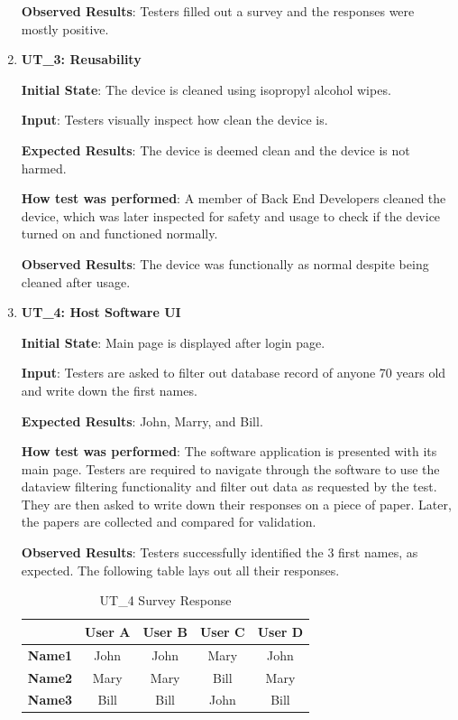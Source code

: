 \documentclass[12pt, titlepage]{article}
\begin{document}
\begin{enumerate}
  \textbf{Observed Results}: Testers filled out a survey and the responses were mostly positive.

  \item\textbf{{UT\_3: Reusability\\}}\label{UT3}

  \textbf{Initial State}: The device is cleaned using isopropyl alcohol wipes.

  \textbf{Input}: Testers visually inspect how clean the device is.

  \textbf{Expected Results}: The device is deemed clean and the device is not harmed.

  \textbf{How test was performed}: A member of Back End Developers cleaned the device, which was later inspected for safety and usage to check if the device turned on and functioned normally.

  \textbf{Observed Results}: The device was functionally as normal despite being cleaned after usage.

  \item\textbf{{UT\_4: Host Software UI \\}}\label{UT4}

  \textbf{Initial State}: Main page is displayed after login page.

  \textbf{Input}: Testers are asked to filter out database record of anyone 70 years old and write down the first names.

  \textbf{Expected Results}: John, Marry, and Bill.

  \textbf{How test was performed}: The software application is presented with its main page. Testers are required to navigate through the software to use the dataview filtering functionality and filter out data as requested by the test. They are then asked to write down their responses on a piece of paper. Later, the papers are collected and compared for validation.

  \textbf{Observed Results}: Testers successfully identified the 3 first names, as expected. The following table lays out all their responses.

\begin{table}[H]
\centering
\caption{UT\_4 Survey Response}
  \begin{tabular}{| c| c | c | c | c |}
\hline
    \textbf{} & \textbf{User A} & \textbf{User B} & \textbf{User C} & \textbf{User D}\\
\hline
\textbf{Name1} & John & John & Mary & John\\
\hline
\textbf{Name2} & Mary & Mary & Bill & Mary \\
\hline
\textbf{Name3} & Bill & Bill & John & Bill \\
\hline
  \end{tabular}
\end{table}

\end{enumerate}
\end{document}
